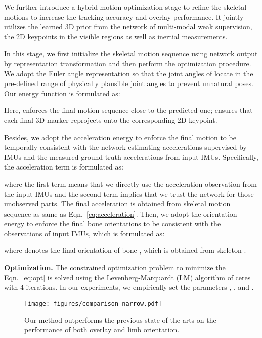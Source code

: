 \documentclass[letterpaper]{article} \usepackage{aaai23}  \usepackage{times}  \usepackage{helvet}  \usepackage{courier}  \usepackage[hyphens]{url}  \usepackage{graphicx} \urlstyle{rm} \def\UrlFont{\rm}  \usepackage{natbib}  \usepackage{caption} \frenchspacing  \setlength{\pdfpagewidth}{8.5in}  \setlength{\pdfpageheight}{11in}  \usepackage{algorithm}
\newcommand{\myparagraph}[1]{\vspace{0.1em}\noindent\textbf{#1}}
\begin{document}
We further introduce a hybrid motion optimization stage to refine the skeletal motions to increase the tracking accuracy and overlay performance.
It jointly utilizes the learned 3D prior from the network of multi-modal weak supervision, the 2D keypoints in the visible regions as well as inertial measurements. 

In this stage, we first initialize the skeletal motion sequence  using network output by representation transformation  and then perform the optimization procedure. 
We adopt the Euler angle representation so that the joint angles  of  locate in the pre-defined range  of physically plausible joint angles to prevent unnatural poses.
Our energy function is formulated as:

Here,  enforces the final motion sequence close to the predicted one;  ensures that each final 3D marker reprojects onto the corresponding 2D keypoint. 




Besides, we adopt the acceleration energy  to enforce the final motion to be temporally consistent with the network estimating accelerations  supervised by  IMUs and the measured ground-truth accelerations  from  input IMUs.
Specifically, the acceleration term  is formulated as:

where the first term means that we directly use the acceleration observation from the input IMUs and the second term implies that we trust the network for those unobserved parts. 
The final acceleration  is obtained from skeletal motion sequence  as same as Eqn.~\ref{eq:acceleration}.
Then, we adopt the orientation energy  to enforce the final bone orientations to be consistent with the observations of  input IMUs, which is formulated as: 

where  denotes the final orientation of bone , which is obtained from skeleton .


\myparagraph{Optimization.}
The constrained optimization problem to minimize the Eqn.~\ref{eq:opt} is solved using the Levenberg-Marquardt (LM) algorithm of ceres~\cite{ceresSolver} 
with 4 iterations. In our experiments, we empirically set the parameters , ,  and .







 \begin{figure}[b]
	\centering
	\texttt{[image: figures/comparison\_narrow.pdf]}
	\caption{Our method outperforms the previous state-of-the-arts on the performance of both overlay and limb orientation.}
	\label{fig:Comparison}
\end{figure}
\end{document}
